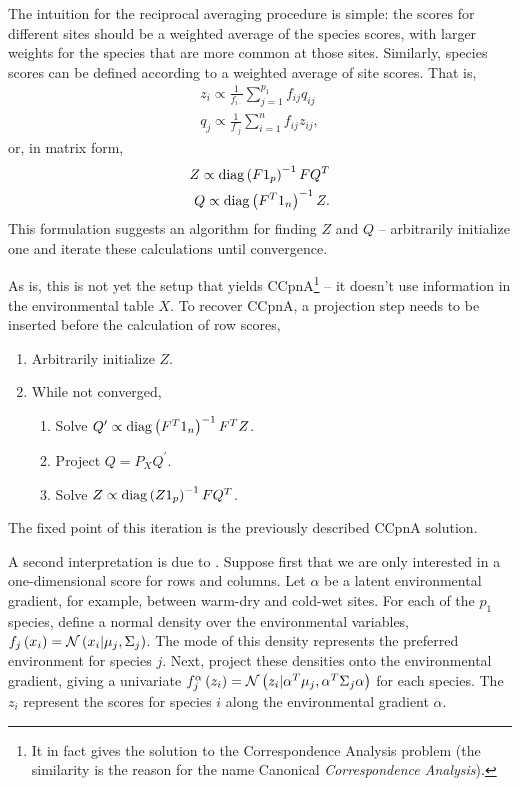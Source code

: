 \documentclass[14pt]{extarticle}
\begin{document}
The intuition for the reciprocal averaging procedure is simple: the scores for
different sites should be a weighted average of the species scores, with larger
weights for the species that are more common at those sites. Similarly, species
scores can be defined according to a weighted average of site scores. That is,
\begin{align*}
  z_{i} \propto \frac{1}{f_{i\cdot}}\sum_{j = 1}^{p_{1}}f_{ij}q_{ij} \\
  q_{j} \propto \frac{1}{f_{\cdot j}} \sum_{i = 1}^{n} f_{ij}z_{ij},
\end{align*}
or, in matrix form,
\begin{align*}
Z \propto \mathop\mathrm{diag}\left(F 1_{p}\right)^{-1} F Q^{T} \\
Q \propto \mathop\mathrm{diag}\left(F^{T} 1_{n}\right)^{-1} Z.
\end{align*}
This formulation suggests an algorithm for finding $Z$ and $Q$ -- arbitrarily
initialize one and iterate these calculations until convergence.

As is, this is not yet the setup that yields CCpnA\footnote{It in fact gives the
  solution to the Correspondence Analysis problem (the similarity is the reason
  for the name Canonical \textit{Correspondence Analysis}).} -- it doesn't use
information in the environmental table $X$. To recover CCpnA, a projection step
needs to be inserted before the calculation of row scores,
\begin{enumerate}
\item Arbitrarily initialize $Z$.
\item While not converged,
\begin{enumerate}
\item Solve $Q^{\prime} \propto \mathop\mathrm{diag}\left(F^{T}1_{n}\right)^{-1}F^{T}Z$.
\item Project $Q = P_{X}Q^{\prime}$.
\item Solve $Z \propto \mathop\mathrm{diag}\left(Z 1_{p}\right)^{-1} F Q^{T}$.
\end{enumerate}
\end{enumerate}

The fixed point of this iteration is the previously described CCpnA solution.

A second interpretation is due to \cite{zhu2005constrained}. Suppose first that
we are only interested in a one-dimensional score for rows and columns. Let
$\alpha$ be a latent environmental gradient, for example, between warm-dry and
cold-wet sites. For each of the $p_{1}$ species, define a normal density over
the environmental variables, $f_{j}\left(x_{i}\right) = \mathcal{N}\left(x_i \vert
\mu_{j}, \Sigma_{j}\right)$. The mode of this density represents the preferred
environment for species $j$. Next, project these densities onto the
environmental gradient, giving a univariate $f_{j}^{\alpha}\left(z_{i}\right) =
\mathcal{N}\left(z_i \vert \alpha^{T}\mu_{j}, \alpha^{T} \Sigma_{j}\alpha\right)$ for
each species. The $z_{i}$ represent the scores for species $i$ along the
environmental gradient $\alpha$.
\end{document}
